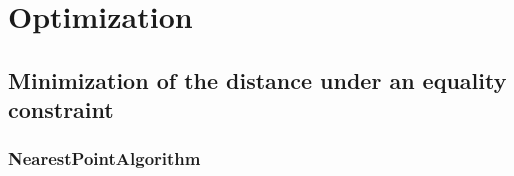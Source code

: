 \newpage\section{Optimization}

\subsection{Minimization of the distance under an equality constraint}

\subsubsection{NearestPointAlgorithm}

